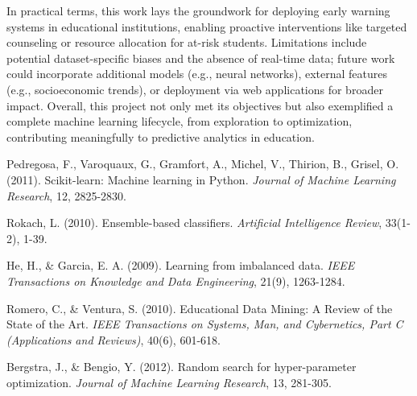 \documentclass[twoside,final]{hcmut-report}
\begin{document}
In practical terms, this work lays the groundwork for deploying early warning systems in educational institutions, enabling proactive interventions like targeted counseling or resource allocation for at-risk students. Limitations include potential dataset-specific biases and the absence of real-time data; future work could incorporate additional models (e.g., neural networks), external features (e.g., socioeconomic trends), or deployment via web applications for broader impact. Overall, this project not only met its objectives but also exemplified a complete machine learning lifecycle, from exploration to optimization, contributing meaningfully to predictive analytics in education.

\begin{thebibliography}{9}
  Pedregosa, F., Varoquaux, G., Gramfort, A., Michel, V., Thirion, B., Grisel, O. (2011). Scikit-learn: Machine learning in Python. \textit{Journal of Machine Learning Research}, 12, 2825-2830.

  Rokach, L. (2010). Ensemble-based classifiers. \textit{Artificial Intelligence Review}, 33(1-2), 1-39.

  He, H., \& Garcia, E. A. (2009). Learning from imbalanced data. \textit{IEEE Transactions on Knowledge and Data Engineering}, 21(9), 1263-1284.

  Romero, C., \& Ventura, S. (2010). Educational Data Mining: A Review of the State of the Art. \textit{IEEE Transactions on Systems, Man, and Cybernetics, Part C (Applications and Reviews)}, 40(6), 601-618.

  Bergstra, J., \& Bengio, Y. (2012). Random search for hyper-parameter optimization. \textit{Journal of Machine Learning Research}, 13, 281-305.
\end{thebibliography}
\end{document}
